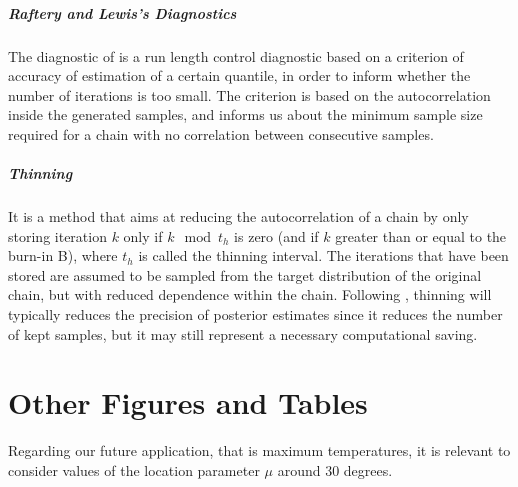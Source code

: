 \paragraph*{Raftery and Lewis’s Diagnostics}
The diagnostic of \citet{raftery1992}  is a run length control diagnostic based on a criterion of accuracy of estimation of a certain quantile, in order to inform whether the number of iterations is too small. The criterion is based on the autocorrelation inside the generated samples, and informs us about the minimum sample size required for a chain with no correlation between consecutive samples.


\paragraph*{Thinning} It is a method that aims at reducing the autocorrelation of a chain by only storing iteration $k$ only if $k\mod t_h$ is zero (and if $k$ greater than or equal to the burn-in B), where $t_h$ is called the thinning interval.
The iterations that have been stored are assumed to be sampled from the target distribution of the original chain, but with reduced dependence within the chain.
Following \citet{bay_thin_2012}, thinning will typically reduces the precision of posterior estimates since it reduces the number of kept samples, but it may still represent a necessary computational saving.


\chapter{Other Figures and Tables}\label{app:fig}


Regarding our future application, that is maximum temperatures, it is relevant to consider values of the location parameter $\mu$ around 30 degrees. 


